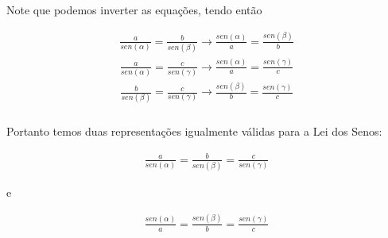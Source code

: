 \documentclass[handout]{beamer}
\begin{document}

\begin{frame}\frametitle{\secname}
    Note que podemos inverter as equações, tendo então
    \begin{block}{}%
        \begin{align*}
            \frac{a}{sen(\alpha)} = \frac{b}{sen(\beta)} \rightarrow \frac{sen(\alpha)}{a} = \frac{sen(\beta)}{b}
        \end{align*}
        \begin{align*}
            \frac{a}{sen(\alpha)} = \frac{c}{sen(\gamma)} \rightarrow \frac{sen(\alpha)}{a} = \frac{sen(\gamma)}{c}
        \end{align*}
        \begin{align*}
            \frac{b}{sen(\beta)} = \frac{c}{sen(\gamma)} \rightarrow \frac{sen(\beta)}{b} = \frac{sen(\gamma)}{c}
        \end{align*}
    \end{block}
\end{frame}

\begin{frame}\frametitle{\secname}
    Portanto temos duas representações igualmente válidas para a Lei dos Senos:
    \begin{block}{}
        \begin{align*}
            \frac{a}{sen(\alpha)} = \frac{b}{sen(\beta)} = \frac{c}{sen(\gamma)}
        \end{align*}
    \end{block}
    e
    \begin{block}{}
        \begin{align*}
            \frac{sen(\alpha)}{a} = \frac{sen(\beta)}{b} = \frac{sen(\gamma)}{c}
        \end{align*}
    \end{block}
\end{frame}


\end{document}

